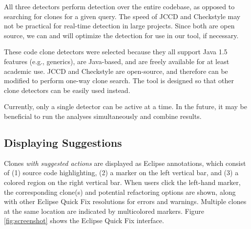 \documentclass[nocopyrightspace,10pt]{sigplanconf}
\begin{document}
All three detectors perform detection over the entire codebase, as
opposed to searching for clones for a given query. The speed of JCCD
and Checkstyle may not be practical for real-time detection in large
projects. Since both are open source, we can and will optimize the
detection for use in our tool, if necessary.  

These code clone detectors were selected because they all support Java
1.5 features (e.g., generics), are Java-based, and are freely
available for at least academic use. JCCD and Checkstyle are
open-source, and therefore can be modified to perform one-way clone
search. 
The tool is designed so that other clone detectors can be easily used instead.



Currently, only a single detector can be active at a time. In the
future, it may be beneficial to run the analyses simultaneously and
combine results.

\subsection{Displaying Suggestions}
\label{sec:display}
Clones \emph{with suggested actions} are displayed as Eclipse
annotations, which consist of (1) source code highlighting, (2) a
marker on the left vertical bar, and (3) a colored region on the right
vertical bar.
When users click the left-hand marker,
the corresponding clone(s) and potential refactoring options are shown,
along with other Eclipse Quick Fix resolutions for errors and warnings.
Multiple clones at the same location are indicated by multicolored markers.
Figure \ref{fig:screenshot} shows the Eclipse Quick Fix interface.
\end{document}
